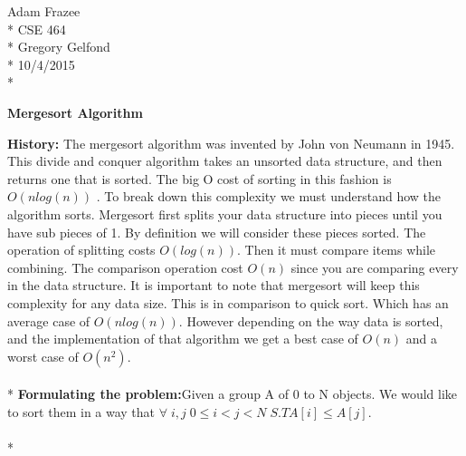 \documentclass{article}
\begin{document}
	\begin{flushleft}
		Adam Frazee \\*
		CSE 464\\*
		Gregory Gelfond\\*
		10/4/2015\\*
	\end{flushleft}
	\begin{center}
		\LARGE{\textbf{Mergesort Algorithm}}
	\end{center}
	\large{\textbf{History:}} The mergesort algorithm was invented by
	 John von Neumann in 1945. This divide and conquer algorithm takes an 
	 unsorted data structure, and then returns one that is sorted. The 
	 big O cost of sorting in this fashion is $O(n log(n))$ . To break 
	 down this complexity we must understand how the algorithm sorts. 
	 Mergesort first splits your data structure into pieces until you 
	 have sub pieces of 1. By definition we will consider these pieces 
	 sorted. The operation of splitting costs $O(log(n))$. Then it must 
	 compare items while combining. The comparison operation cost $O(n)$ 
	 since you are comparing every in the data structure. It is important 
	 to note that mergesort will keep this complexity for any data size. 
	 This is in comparison to quick sort. Which has an average case of 
	 $O(n log(n))$. However depending on the way data is sorted, and the 
	 implementation of that algorithm we get a best case of  $O(n)$ and a 
	 worst case of $O(n^2)$.
	\\
	\\*	
	\large{\textbf{Formulating the problem:}}Given a group A of 0 to N 
	objects. We would like to sort them in a way that $\forall \; i,j \; 
	0 \leq i < j < N \; S.T A[i]\leq A[j] $.
	\\
	\\*
\end{document}
